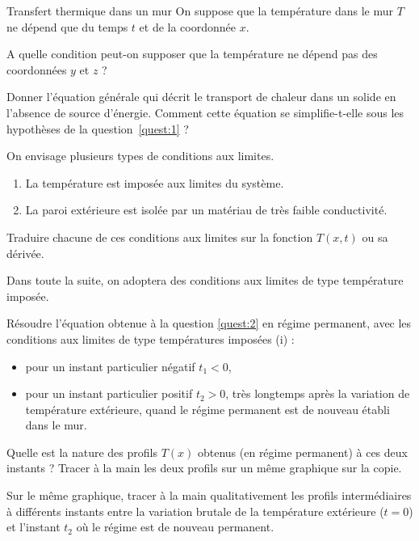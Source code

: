 \begin{exo}[PC][1][devoir]{Transfert thermique dans un mur}
On suppose que la température dans le mur $T$ ne dépend que du temps $t$ et de la coordonnée $x$.
\begin{quest}
\item\label{quest:1}  A quelle condition peut-on supposer que la température ne dépend pas des coordonnées $y$ et $z$ ?
\item\label{quest:2} Donner l’équation générale qui décrit le transport de chaleur dans un solide en l’absence de source d’énergie. Comment cette équation se simplifie-t-elle sous les hypothèses de la question~\ref{quest:1} ?
\end{quest}
On envisage plusieurs types de conditions aux limites.
\begin{enumerate}
\item[(i)] La température est imposée aux limites du système.
\item[(ii)] La paroi extérieure est isolée par un matériau de très faible conductivité.
\end{enumerate}
\begin{quest}
\item
 Traduire chacune de ces conditions aux limites sur la fonction $T(x,t)$ ou sa dérivée.
\end{quest}
Dans toute la suite, on adoptera des conditions aux limites de type température imposée.

\begin{quest}
\item Résoudre l’équation obtenue à la question \ref{quest:2} en régime permanent, avec les conditions aux limites de type températures imposées (i) :
\begin{itemize}
\item pour un instant particulier négatif $t_1 < 0$,
\item pour un instant particulier positif $t_2 > 0$, très longtemps après la variation de température extérieure, quand le régime permanent est de nouveau établi dans le mur.
\end{itemize}

\item Quelle est la nature des profils $T(x)$ obtenus (en régime permanent) à ces deux instants ?
Tracer à la main les deux profils sur un même graphique sur la copie.
\item Sur le même graphique, tracer à la main qualitativement les profils intermédiaires à différents instants entre la variation brutale de la température extérieure ($t = 0$) et l’instant $t_2$ où le régime est de nouveau permanent.
\end{quest}
\end{exo}

